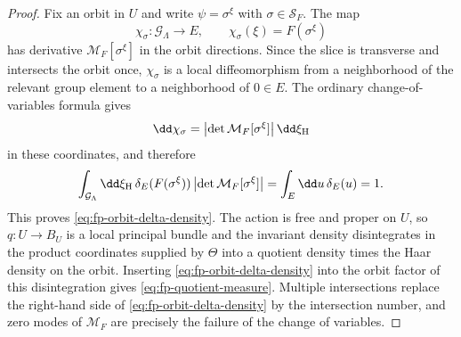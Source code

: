 \begin{proof}
Fix an orbit in \(U\) and write \(\psi=\sigma^\xi\) with
\(\sigma\in\mathcal S_F\).  The map
\[
  \chi_\sigma:\mathcal G_\Lambda\longrightarrow E,
  \qquad
  \chi_\sigma(\xi)=F(\sigma^\xi)
\]
has derivative \(\mathcal M_F[\sigma^\xi]\) in the orbit directions.  Since the
slice is transverse and intersects the orbit once, \(\chi_\sigma\) is a local
diffeomorphism from a neighborhood of the relevant group element to a
neighborhood of \(0\in E\).  The ordinary change-of-variables formula gives
\[
  \dd\chi_\sigma
  =
  \bigl|\det\mathcal M_F[\sigma^\xi]\bigr|\,\dd\xi_{\rm H}
\]
in these coordinates, and therefore
\[
  \int_{\mathcal G_\Lambda}\dd\xi_{\rm H}\,
  \delta_E(F(\sigma^\xi))\,
  \bigl|\det\mathcal M_F[\sigma^\xi]\bigr|
  =
  \int_E\dd u\,\delta_E(u)
  =
  1 .
\]
This proves \eqref{eq:fp-orbit-delta-density}.  The action is free and proper
on \(U\), so \(q:U\to B_U\) is a local principal bundle and the invariant
density disintegrates in the product coordinates supplied by \(\Theta\) into a
quotient density times the Haar density on the orbit.  Inserting
\eqref{eq:fp-orbit-delta-density} into the orbit factor of this disintegration
gives \eqref{eq:fp-quotient-measure}.  Multiple intersections replace the
right-hand side of \eqref{eq:fp-orbit-delta-density} by the intersection
number, and zero modes of \(\mathcal M_F\) are precisely the failure of the
change of variables.
\end{proof}

